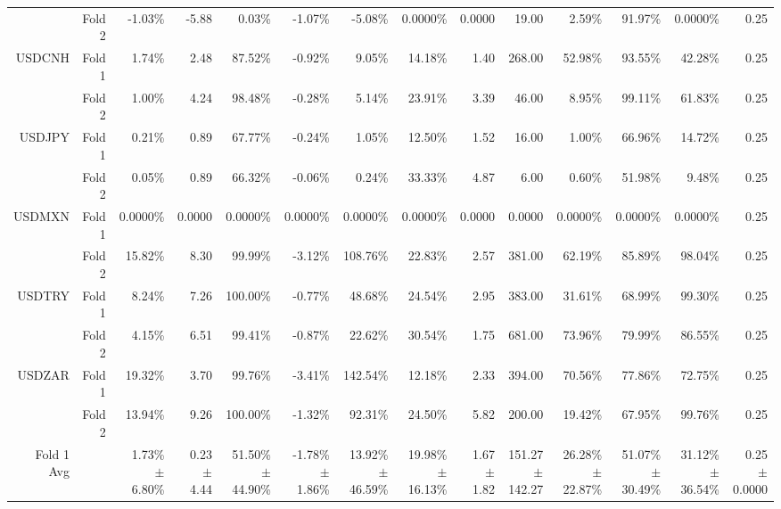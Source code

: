 \begin{table}[H]
{\begin{tabular}{rrrrrrrrrrrrrr}
 & Fold 2 & -1.03\% & -5.88 & 0.03\% & -1.07\% & -5.08\% & 0.0000\% & 0.0000 & 19.00 & 2.59\% & 91.97\% & 0.0000\% & 0.25 \\
USDCNH & Fold 1 & 1.74\% & 2.48 & 87.52\% & -0.92\% & 9.05\% & 14.18\% & 1.40 & 268.00 & 52.98\% & 93.55\% & 42.28\% & 0.25 \\
 & Fold 2 & 1.00\% & 4.24 & 98.48\% & -0.28\% & 5.14\% & 23.91\% & 3.39 & 46.00 & 8.95\% & 99.11\% & 61.83\% & 0.25 \\
USDJPY & Fold 1 & 0.21\% & 0.89 & 67.77\% & -0.24\% & 1.05\% & 12.50\% & 1.52 & 16.00 & 1.00\% & 66.96\% & 14.72\% & 0.25 \\
 & Fold 2 & 0.05\% & 0.89 & 66.32\% & -0.06\% & 0.24\% & 33.33\% & 4.87 & 6.00 & 0.60\% & 51.98\% & 9.48\% & 0.25 \\
USDMXN & Fold 1 & 0.0000\% & 0.0000 & 0.0000\% & 0.0000\% & 0.0000\% & 0.0000\% & 0.0000 & 0.0000 & 0.0000\% & 0.0000\% & 0.0000\% & 0.25 \\
 & Fold 2 & 15.82\% & 8.30 & 99.99\% & -3.12\% & 108.76\% & 22.83\% & 2.57 & 381.00 & 62.19\% & 85.89\% & 98.04\% & 0.25 \\
USDTRY & Fold 1 & 8.24\% & 7.26 & 100.00\% & -0.77\% & 48.68\% & 24.54\% & 2.95 & 383.00 & 31.61\% & 68.99\% & 99.30\% & 0.25 \\
 & Fold 2 & 4.15\% & 6.51 & 99.41\% & -0.87\% & 22.62\% & 30.54\% & 1.75 & 681.00 & 73.96\% & 79.99\% & 86.55\% & 0.25 \\
USDZAR & Fold 1 & 19.32\% & 3.70 & 99.76\% & -3.41\% & 142.54\% & 12.18\% & 2.33 & 394.00 & 70.56\% & 77.86\% & 72.75\% & 0.25 \\
 & Fold 2 & 13.94\% & 9.26 & 100.00\% & -1.32\% & 92.31\% & 24.50\% & 5.82 & 200.00 & 19.42\% & 67.95\% & 99.76\% & 0.25 \\
\midrule
\midrule
Fold 1 Avg &  & \shortstack{1.73\% \\ $\pm$ 6.80\%} & \shortstack{0.23 \\ $\pm$ 4.44} & \shortstack{51.50\% \\ $\pm$ 44.90\%} & \shortstack{-1.78\% \\ $\pm$ 1.86\%} & \shortstack{13.92\% \\ $\pm$ 46.59\%} & \shortstack{19.98\% \\ $\pm$ 16.13\%} & \shortstack{1.67 \\ $\pm$ 1.82} & \shortstack{151.27 \\ $\pm$ 142.27} & \shortstack{26.28\% \\ $\pm$ 22.87\%} & \shortstack{51.07\% \\ $\pm$ 30.49\%} & \shortstack{31.12\% \\ $\pm$ 36.54\%} & \shortstack{0.25 \\ $\pm$ 0.0000} \\

\end{tabular}}
\end{table}

